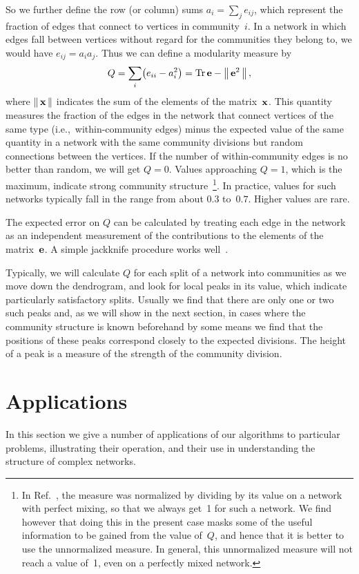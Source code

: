 \documentclass[twocolumn,pre,superscriptaddress]{revtex4}
\begin{document}
So we further define the row (or column) sums $a_i=\sum_j e_{ij}$, which
represent the fraction of edges that connect to vertices in community~$i$.
In a network in which edges fall between vertices without regard for the
communities they belong to, we would have $e_{ij}=a_i a_j$.  Thus we can
define a modularity measure by
\begin{equation}
Q = \sum_i \bigl( e_{ii} - a_i^2 \bigr) = \mathop{\rm Tr}\mathbf{e} - \left\|\,\mathbf{e}^2\,\right\|,
\label{defsq}
\end{equation}
where $\left\|\,\mathbf{x}\,\right\|$ indicates the sum of the elements of the matrix~$\mathbf{x}$.
This quantity measures the fraction of the edges in the network that
connect vertices of the same type (i.e.,~within-community edges) minus the
expected value of the same quantity in a network with the same community
divisions but random connections between the vertices.  If the number of
within-community edges is no better than random, we will get $Q=0$.  Values
approaching $Q=1$, which is the maximum, indicate strong community
structure~\footnote{In Ref.~, the measure was
normalized by dividing by its value on a network with perfect mixing, so
that we always get~1 for such a network.  We find however that doing this
in the present case masks some of the useful information to be gained from
the value of~$Q$, and hence that it is better to use the unnormalized
measure.  In general, this unnormalized measure will not reach a value
of~1, even on a perfectly mixed network.}.  In practice, values for such
networks typically fall in the range from about $0.3$ to~$0.7$.  Higher
values are rare.

The expected error on $Q$ can be calculated by treating each edge in the
network as an independent measurement of the contributions to the elements
of the matrix~$\mathbf{e}$.  A simple jackknife procedure works
well~\cite{Efron79,Newman03c}.

Typically, we will calculate $Q$ for each split of a network into
communities as we move down the dendrogram, and look for local peaks in its
value, which indicate particularly satisfactory splits.  Usually we find
that there are only one or two such peaks and, as we will show in the next
section, in cases where the community structure is known beforehand by some
means we find that the positions of these peaks correspond closely to the
expected divisions.  The height of a peak is a measure of the strength of
the community division.


\section{Applications}
\label{apps}
In this section we give a number of applications of our algorithms to
particular problems, illustrating their operation, and their use in
understanding the structure of complex networks.
\end{document}
